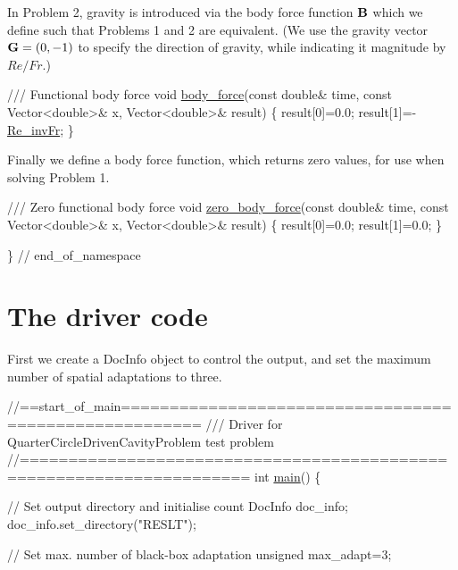 In Problem 2, gravity is introduced via the body force function $ {\bf B}$ which we define such that Problems 1 and 2 are equivalent. (We use the gravity vector $ {\bf G} = (0,-1)$ to specify the direction of gravity, while indicating it magnitude by $ Re/Fr.$)


\begin{DoxyCodeInclude}
\textcolor{comment}{}
\textcolor{comment}{ /// Functional body force}
\textcolor{comment}{} \textcolor{keywordtype}{void} \hyperlink{namespaceGlobal__Physical__Variables_a87da705b8a46bed337cf5dbdd788b87b}{body\_force}(\textcolor{keyword}{const} \textcolor{keywordtype}{double}& time, \textcolor{keyword}{const} Vector<double>& x, 
                 Vector<double>& result)
 \{
  result[0]=0.0;
  result[1]=-\hyperlink{namespaceGlobal__Physical__Variables_ab1a845a672b4d74b304639a976dc65c6}{Re\_invFr};
 \}

\end{DoxyCodeInclude}


Finally we define a body force function, which returns zero values, for use when solving Problem 1.


\begin{DoxyCodeInclude}
\textcolor{comment}{}
\textcolor{comment}{ /// Zero functional body force}
\textcolor{comment}{} \textcolor{keywordtype}{void} \hyperlink{namespaceGlobal__Physical__Variables_a9780d615ae07c4e00a436ab2973b54e6}{zero\_body\_force}(\textcolor{keyword}{const} \textcolor{keywordtype}{double}& time, \textcolor{keyword}{const} Vector<double>& x, 
                      Vector<double>& result)
 \{
  result[0]=0.0;
  result[1]=0.0;
 \}

\} \textcolor{comment}{// end\_of\_namespace}

\end{DoxyCodeInclude}




 

\hypertarget{index_main}{}\section{The driver code}\label{index_main}
First we create a {\ttfamily Doc\+Info} object to control the output, and set the maximum number of spatial adaptations to three.


\begin{DoxyCodeInclude}
\textcolor{comment}{//==start\_of\_main======================================================}
\textcolor{comment}{/// Driver for QuarterCircleDrivenCavityProblem test problem }
\textcolor{comment}{}\textcolor{comment}{//=====================================================================}
\textcolor{keywordtype}{int} \hyperlink{circular__driven__cavity_8cc_ae66f6b31b5ad750f1fe042a706a4e3d4}{main}()
\{

 \textcolor{comment}{// Set output directory and initialise count}
 DocInfo doc\_info;
 doc\_info.set\_directory(\textcolor{stringliteral}{"RESLT"});

 \textcolor{comment}{// Set max. number of black-box adaptation}
 \textcolor{keywordtype}{unsigned} max\_adapt=3;

\end{DoxyCodeInclude}


